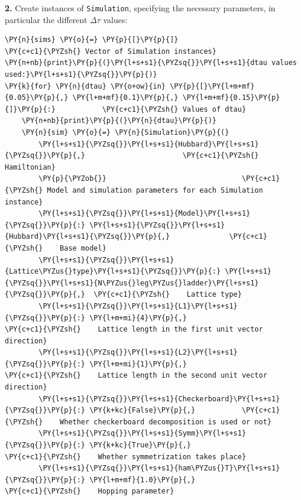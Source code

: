    \textbf{2.} Create instances of \texttt{Simulation}, specifying the
necessary parameters, in particular the different \(\Delta \tau\)
values:

    \begin{tcolorbox}[breakable, size=fbox, boxrule=1pt, pad at break*=1mm,colback=cellbackground, colframe=cellborder]
\begin{Verbatim}[commandchars=\\\{\}]
\PY{n}{sims} \PY{o}{=} \PY{p}{[}\PY{p}{]}                                \PY{c+c1}{\PYZsh{} Vector of Simulation instances}
\PY{n+nb}{print}\PY{p}{(}\PY{l+s+s1}{\PYZsq{}}\PY{l+s+s1}{dtau values used:}\PY{l+s+s1}{\PYZsq{}}\PY{p}{)}
\PY{k}{for} \PY{n}{dtau} \PY{o+ow}{in} \PY{p}{[}\PY{l+m+mf}{0.05}\PY{p}{,} \PY{l+m+mf}{0.1}\PY{p}{,} \PY{l+m+mf}{0.15}\PY{p}{]}\PY{p}{:}           \PY{c+c1}{\PYZsh{} Values of dtau}
    \PY{n+nb}{print}\PY{p}{(}\PY{n}{dtau}\PY{p}{)}
    \PY{n}{sim} \PY{o}{=} \PY{n}{Simulation}\PY{p}{(}
        \PY{l+s+s1}{\PYZsq{}}\PY{l+s+s1}{Hubbard}\PY{l+s+s1}{\PYZsq{}}\PY{p}{,}                       \PY{c+c1}{\PYZsh{} Hamiltonian}
        \PY{p}{\PYZob{}}                                \PY{c+c1}{\PYZsh{} Model and simulation parameters for each Simulation instance}
        \PY{l+s+s1}{\PYZsq{}}\PY{l+s+s1}{Model}\PY{l+s+s1}{\PYZsq{}}\PY{p}{:} \PY{l+s+s1}{\PYZsq{}}\PY{l+s+s1}{Hubbard}\PY{l+s+s1}{\PYZsq{}}\PY{p}{,}              \PY{c+c1}{\PYZsh{}    Base model}
        \PY{l+s+s1}{\PYZsq{}}\PY{l+s+s1}{Lattice\PYZus{}type}\PY{l+s+s1}{\PYZsq{}}\PY{p}{:} \PY{l+s+s1}{\PYZsq{}}\PY{l+s+s1}{N\PYZus{}leg\PYZus{}ladder}\PY{l+s+s1}{\PYZsq{}}\PY{p}{,}  \PY{c+c1}{\PYZsh{}    Lattice type}
        \PY{l+s+s1}{\PYZsq{}}\PY{l+s+s1}{L1}\PY{l+s+s1}{\PYZsq{}}\PY{p}{:} \PY{l+m+mi}{4}\PY{p}{,}                         \PY{c+c1}{\PYZsh{}    Lattice length in the first unit vector direction}
        \PY{l+s+s1}{\PYZsq{}}\PY{l+s+s1}{L2}\PY{l+s+s1}{\PYZsq{}}\PY{p}{:} \PY{l+m+mi}{1}\PY{p}{,}                         \PY{c+c1}{\PYZsh{}    Lattice length in the second unit vector direction}
        \PY{l+s+s1}{\PYZsq{}}\PY{l+s+s1}{Checkerboard}\PY{l+s+s1}{\PYZsq{}}\PY{p}{:} \PY{k+kc}{False}\PY{p}{,}           \PY{c+c1}{\PYZsh{}    Whether checkerboard decomposition is used or not}
        \PY{l+s+s1}{\PYZsq{}}\PY{l+s+s1}{Symm}\PY{l+s+s1}{\PYZsq{}}\PY{p}{:} \PY{k+kc}{True}\PY{p}{,}                    \PY{c+c1}{\PYZsh{}    Whether symmetrization takes place}
        \PY{l+s+s1}{\PYZsq{}}\PY{l+s+s1}{ham\PYZus{}T}\PY{l+s+s1}{\PYZsq{}}\PY{p}{:} \PY{l+m+mf}{1.0}\PY{p}{,}                    \PY{c+c1}{\PYZsh{}    Hopping parameter}

\end{Verbatim}
\end{tcolorbox}
